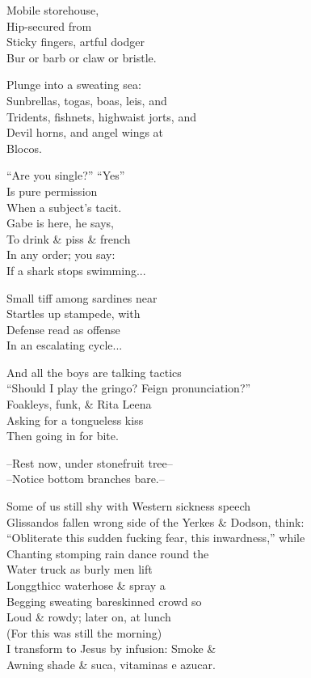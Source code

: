 Mobile storehouse, \\
Hip-secured from \\
Sticky fingers, artful dodger \\
Bur or barb or claw or bristle.

Plunge into a sweating sea: \\
Sunbrellas, togas, boas, leis, and \\
Tridents, fishnets, highwaist jorts, and \\
Devil horns, and angel wings at \\
Blocos. 

``Are you single?'' ``Yes'' \\
Is pure permission \\
When a subject's tacit. \\
Gabe is here, he says, \\
To drink \& piss \& french \\
In any order; you say: \\
If a shark stops swimming...

Small tiff among sardines near \\
Startles up stampede, with \\
Defense read as offense \\
In an escalating cycle...

And all the boys are talking tactics \\
``Should I play the gringo? Feign pronunciation?'' \\
Foakleys, funk, \& Rita Leena \\
Asking for a tongueless kiss \\
Then going in for bite. 

--Rest now, under stonefruit tree-- \\
--Notice bottom branches bare.--

Some of us still shy with Western sickness speech \\
Glissandos fallen wrong side of the Yerkes \& Dodson, think: \\
``Obliterate this sudden fucking fear, this inwardness,'' while \\
Chanting stomping rain dance round the \\
Water truck as burly men lift \\
Longgthicc waterhose \& spray a \\
Begging sweating bareskinned crowd so \\
Loud \& rowdy; later on, at lunch \\
(For this was still the morning) \\
I transform to Jesus by infusion: Smoke \& \\
Awning shade \& suca, vitaminas e azucar. 